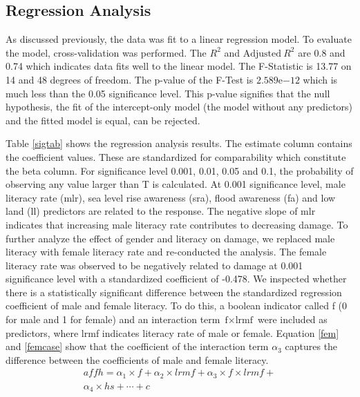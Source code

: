 \documentclass[preprint,review,12pt]{elsarticle}
\begin{document}
\subsection{Regression Analysis}
\label{rga}
As discussed previously, the data was fit to a linear regression model. To evaluate the model, cross-validation was performed. The $R^{2}$ and $\text{Adjusted}~R^{2}$ are 0.8 and 0.74 which indicates data fits well to the linear model. The F-Statistic is 13.77 on 14 and 48 degrees of freedom. The p-value of the F-Test is $2.589\mathrm{e}{-12}$ which is much less than the 0.05 significance level. This p-value signifies that the null hypothesis, the fit of the intercept-only model (the model without any predictors) and the fitted model is equal, can be rejected. 

Table \ref{sigtab} shows the regression analysis results. The estimate column contains the coefficient values. These are standardized for comparability which constitute the beta column. For significance level 0.001, 0.01, 0.05 and 0.1, the probability of observing any value larger than T is calculated. At 0.001 significance level, male literacy rate (mlr), sea level rise awareness (sra), flood awareness (fa) and low land (ll) predictors are related to the response. The negative slope of mlr indicates that increasing male literacy rate contributes to decreasing damage. To further analyze the effect of gender and literacy on damage, we replaced male literacy with female literacy rate and re-conducted the analysis. The female literacy rate was observed to be negatively related to damage at 0.001 significance level with a standardized coefficient of -0.478. We inspected whether there is a statistically significant difference between the standardized regression coefficient of male and female literacy. To do this, a boolean indicator called f (0 for male and 1 for female) and an interaction term $\text{f} \times \text{lrmf}$ were included as predictors, where lrmf indicates literacy rate of male or female. Equation \ref{fem} and \ref{femcase} show that the coefficient of the interaction term $\alpha_{3}$ captures the difference between the coefficients of male and female literacy.
\begin{equation}
\begin{split}
affh=\alpha_{1} \times f + \alpha_{2} \times lrmf+ \alpha_{3} \times f \times lrmf+\\
\alpha_{4} \times hs + \cdots + c 
\label{fem}
\end{split}
\end{equation}
\end{document}
